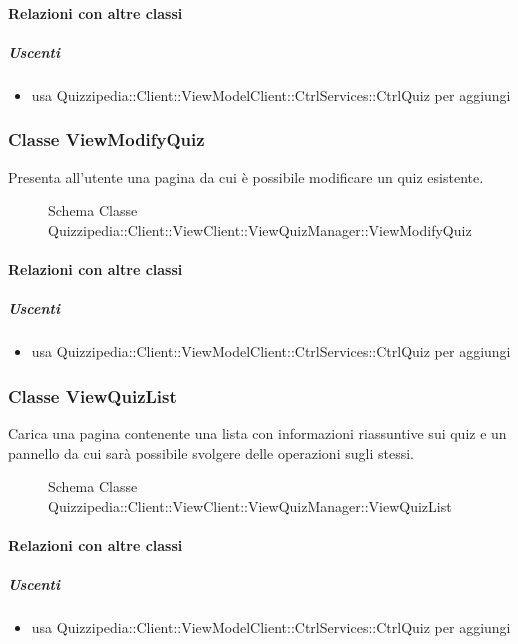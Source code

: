 \paragraph{Relazioni con altre classi}
\subparagraph{Uscenti}
\begin{itemize}
\item usa Quizzipedia::Client::ViewModelClient::CtrlServices::CtrlQuiz per aggiungi
\end{itemize}
\subsubsection{Classe ViewModifyQuiz}
Presenta all'utente una pagina da cui è possibile modificare un quiz esistente.
\begin{figure}[H]
\centering
\noindent{}
\caption[Schema Classe ViewModifyQuiz]{Schema Classe Quizzipedia::Client::ViewClient::ViewQuizManager::ViewModifyQuiz}
\end{figure}
\paragraph{Relazioni con altre classi}
\subparagraph{Uscenti}
\begin{itemize}
\item usa Quizzipedia::Client::ViewModelClient::CtrlServices::CtrlQuiz per aggiungi
\end{itemize}
\subsubsection{Classe ViewQuizList}
Carica una pagina contenente una lista con informazioni riassuntive sui quiz e un pannello da cui sarà possibile svolgere delle operazioni sugli stessi.
\begin{figure}[H]
\centering
\noindent{}
\caption[Schema Classe ViewQuizList]{Schema Classe Quizzipedia::Client::ViewClient::ViewQuizManager::ViewQuizList}
\end{figure}
\paragraph{Relazioni con altre classi}
\subparagraph{Uscenti}
\begin{itemize}
\item usa Quizzipedia::Client::ViewModelClient::CtrlServices::CtrlQuiz per aggiungi
\end{itemize}
